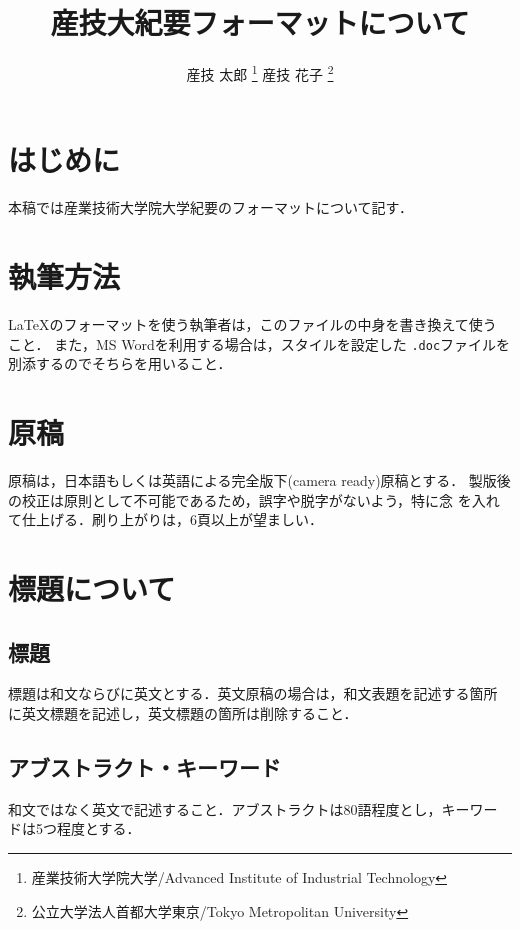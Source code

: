 \documentclass[a4j, 12Q, twocolumn, twoside]{jsarticle}
\title{産技大紀要フォーマットについて}
\author{
  産技 太郎
  \thanks{産業技術大学院大学/Advanced Institute of Industrial
  Technology}
  産技 花子
  \thanks{公立大学法人首都大学東京/Tokyo Metropolitan University}
}
\begin{document}
\amaketitle[5pt]

\section{はじめに}
本稿では産業技術大学院大学紀要のフォーマットについて記す．

\section{執筆方法}
\LaTeX のフォーマットを使う執筆者は，このファイルの中身を書き換えて使う
こと．
%
また，MS Wordを利用する場合は，スタイルを設定した
\texttt{.doc}ファイルを別添するのでそちらを用いること．

\section{原稿}
原稿は，日本語もしくは英語による完全版下(camera ready)原稿とする．
製版後の校正は原則として不可能であるため，誤字や脱字がないよう，特に念
を入れて仕上げる．刷り上がりは，6頁以上が望ましい．

\section{標題について}
\subsection{標題}
標題は和文ならびに英文とする．英文原稿の場合は，和文表題を記述する箇所
に英文標題を記述し，英文標題の箇所は削除すること．

\subsection{アブストラクト・キーワード}
和文ではなく英文で記述すること．アブストラクトは80語程度とし，キーワー
ドは5つ程度とする．
\end{document}
